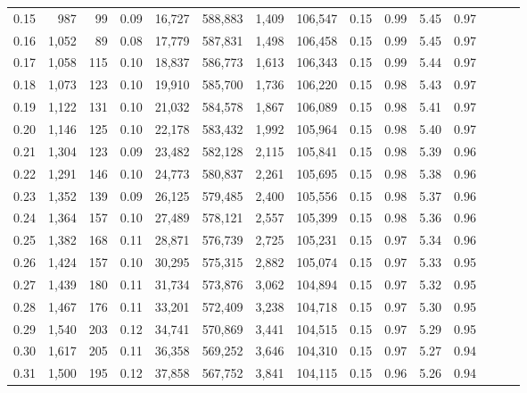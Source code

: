 \begin{tabular}{rrrrrrrrrrrrrrr}
0.15 &     987 &      99 &  0.09 &   16,727 &  588,883 &    1,409 &  106,547 &  0.15 &  0.99 &  5.45 &      0.97 \\
0.16 &   1,052 &      89 &  0.08 &   17,779 &  587,831 &    1,498 &  106,458 &  0.15 &  0.99 &  5.45 &      0.97 \\
0.17 &   1,058 &     115 &  0.10 &   18,837 &  586,773 &    1,613 &  106,343 &  0.15 &  0.99 &  5.44 &      0.97 \\
0.18 &   1,073 &     123 &  0.10 &   19,910 &  585,700 &    1,736 &  106,220 &  0.15 &  0.98 &  5.43 &      0.97 \\
0.19 &   1,122 &     131 &  0.10 &   21,032 &  584,578 &    1,867 &  106,089 &  0.15 &  0.98 &  5.41 &      0.97 \\
0.20 &   1,146 &     125 &  0.10 &   22,178 &  583,432 &    1,992 &  105,964 &  0.15 &  0.98 &  5.40 &      0.97 \\
0.21 &   1,304 &     123 &  0.09 &   23,482 &  582,128 &    2,115 &  105,841 &  0.15 &  0.98 &  5.39 &      0.96 \\
0.22 &   1,291 &     146 &  0.10 &   24,773 &  580,837 &    2,261 &  105,695 &  0.15 &  0.98 &  5.38 &      0.96 \\
0.23 &   1,352 &     139 &  0.09 &   26,125 &  579,485 &    2,400 &  105,556 &  0.15 &  0.98 &  5.37 &      0.96 \\
0.24 &   1,364 &     157 &  0.10 &   27,489 &  578,121 &    2,557 &  105,399 &  0.15 &  0.98 &  5.36 &      0.96 \\
0.25 &   1,382 &     168 &  0.11 &   28,871 &  576,739 &    2,725 &  105,231 &  0.15 &  0.97 &  5.34 &      0.96 \\
0.26 &   1,424 &     157 &  0.10 &   30,295 &  575,315 &    2,882 &  105,074 &  0.15 &  0.97 &  5.33 &      0.95 \\
0.27 &   1,439 &     180 &  0.11 &   31,734 &  573,876 &    3,062 &  104,894 &  0.15 &  0.97 &  5.32 &      0.95 \\
0.28 &   1,467 &     176 &  0.11 &   33,201 &  572,409 &    3,238 &  104,718 &  0.15 &  0.97 &  5.30 &      0.95 \\
0.29 &   1,540 &     203 &  0.12 &   34,741 &  570,869 &    3,441 &  104,515 &  0.15 &  0.97 &  5.29 &      0.95 \\
0.30 &   1,617 &     205 &  0.11 &   36,358 &  569,252 &    3,646 &  104,310 &  0.15 &  0.97 &  5.27 &      0.94 \\
0.31 &   1,500 &     195 &  0.12 &   37,858 &  567,752 &    3,841 &  104,115 &  0.15 &  0.96 &  5.26 &      0.94 \\

\end{tabular}
